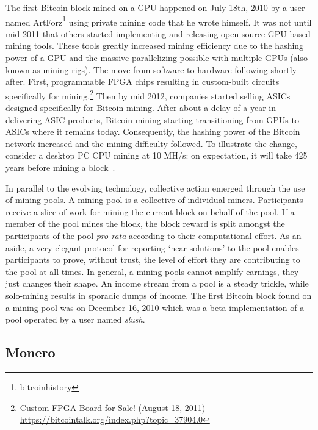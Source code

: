 The first Bitcoin block mined on a GPU happened on July 18th, 2010 by a user named ArtForz\footnote{bitcoinhistory} using private mining code that he wrote himself. It was not until mid 2011 that others started implementing and releasing open source GPU-based mining tools. These tools greatly increased mining efficiency due to the hashing power of a GPU and the massive parallelizing possible with multiple GPUs (also known as mining rigs). The move from software to hardware following shortly after. First, programmable FPGA chips resulting in custom-built circuits specifically for mining.\footnote{Custom FPGA Board for Sale! (August 18, 2011) \url{https://bitcointalk.org/index.php?topic=37904.0}} Then by mid 2012, companies started selling ASICs designed specifically for Bitcoin mining. After about a delay of a year in delivering ASIC products, Bitcoin mining starting transitioning from GPUs to ASICs where it remains today. Consequently, the hashing power of the Bitcoin network increased and the mining difficulty followed. To illustrate the change, consider a desktop PC CPU mining at 10 MH/s: on expectation, it will take 425 years before mining a block~\cite{huang2014botcoin}. 

In parallel to the evolving technology, collective action emerged through the use of mining pools. A mining pool is a collective of individual miners. Participants receive a slice of work for mining the current block on behalf of the pool. If a member of the pool mines the block, the block reward is split amongst the participants of the pool \textit{pro rata} according to their computational effort. As an aside, a very elegant protocol for reporting `near-solutions' to the pool enables participants to prove, without trust, the level of effort they are contributing to the pool at all times. In general, a mining pools cannot amplify earnings, they just changes their shape. An income stream from a pool is a steady trickle, while solo-mining results in sporadic dumps of income. The first Bitcoin block found on a mining pool was on December 16, 2010 which was a beta implementation of a pool operated by a user named \textit{slush}.

\subsection{Monero}

